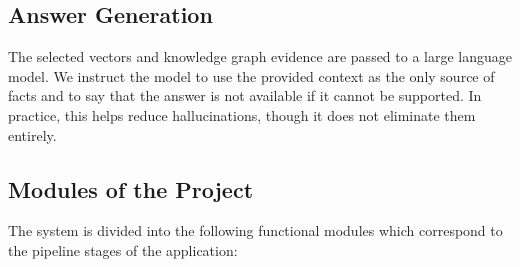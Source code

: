 \documentclass[12pt,a4paper]{report}
\begin{document}
\subsection{Answer Generation}

The selected vectors and knowledge graph evidence are passed to a large language model. We instruct the model to use the provided context as the only source of facts and to say that the answer is not available if it cannot be supported. In practice, this helps reduce hallucinations, though it does not eliminate them entirely.
\subsection{Modules of the Project}

The system is divided into the following functional modules which correspond to the pipeline stages of the application:
\end{document}
